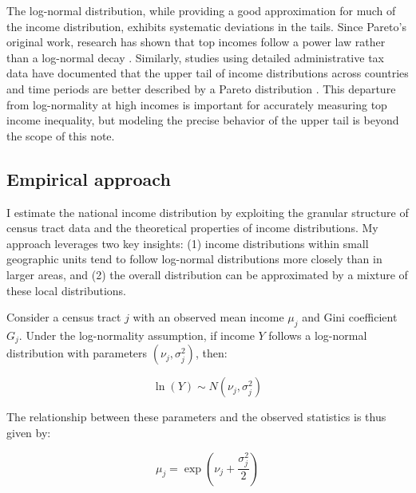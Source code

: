 
The log-normal distribution, while providing a good approximation for much of the income distribution, exhibits systematic deviations in the tails. Since Pareto's \citeyearpar{pareto1896cours} original work, research has shown that top incomes follow a power law rather than a log-normal decay \citep{gabaix2016power}. Similarly, studies using detailed administrative tax data have documented that the upper tail of income distributions across countries and time periods are better described by a Pareto distribution \citep{atkinson2011top}. This departure from log-normality at high incomes is important for accurately measuring top income inequality, but modeling the precise behavior of the upper tail is beyond the scope of this note.

\subsection{Empirical approach}

I estimate the national income distribution by exploiting the granular structure of census tract data and the theoretical properties of income distributions. My approach leverages two key insights: (1) income distributions within small geographic units tend to follow log-normal distributions more closely than in larger areas, and (2) the overall distribution can be approximated by a mixture of these local distributions.

Consider a census tract $j$ with an observed mean income $\mu_j$ and Gini coefficient $G_j$. Under the log-normality assumption, if income $Y$ follows a log-normal distribution with parameters $(\nu_j, \sigma_j^2)$, then:

\begin{equation}
\ln(Y) \sim N(\nu_j, \sigma_j^2)
\end{equation}

The relationship between these parameters and the observed statistics is thus given by:

\begin{equation}
\mu_j = \exp\left(\nu_j + \frac{\sigma_j^2}{2}\right)
\end{equation}

